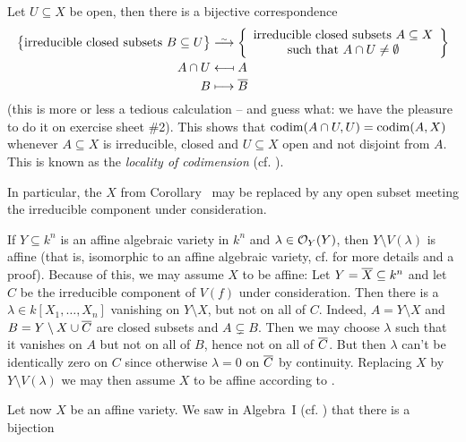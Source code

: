 \documentclass[a4paper,parskip=half,numbers=enddot, DIV=12]{scrreprt}
\begin{document}
\begin{rem}
    \begin{alphanumerate}
	   \item{} Let $U\subseteq X$ be open, then there is a bijective correspondence 
        \begin{align*}
	        \big\{\text{irreducible closed subsets }B\subseteq U\big\}&\isomorphism\left\{
	        \begin{array}{c}
		        \text{irreducible closed subsets }A\subseteq X\\
		        \text{such that }A\cap U\not=\emptyset
	        \end{array}
	        \right\}\\
            A\cap U &\longmapsfrom A\\
            B&\longmapsto \overline{B}
        \end{align*}
        (this is more or less a tedious calculation -- and guess what: we have the pleasure to do it on exercise sheet \#2). This shows that $\operatorname{codim} (A\cap U, U)  = \operatorname{codim}(A,X)$ whenever $A\subseteq X$ is irreducible, closed and $U\subseteq X$ open and not disjoint from $A$. This is known as the \emph{locality of codimension} (cf. \cite[Remark~2.1.3]{alg1}).
        \item In particular, the $X$ from Corollary~ may be replaced by any open subset meeting the irreducible component under consideration.
        \item If $Y\subseteq k^n$ is an affine algebraic variety in $k^n$ and $\lambda\in\mathcal{O}_Y(Y)$, then $Y\setminus V(\lambda)$ is affine (that is, isomorphic to an affine algebraic variety, cf. \cite[Proposition~2.2.4]{alg1} for more details and a proof). Because of this, we may assume $X$ to be affine: Let $Y=\overline X\subseteq k^n$ and let $C$ be the irreducible component of $V(f)$ under consideration. Then there is a $\lambda\in k[X_1,\ldots,X_n]$ vanishing on $Y\setminus X$, but not on all of $C$. Indeed, $A=Y\setminus X$ and $B= Y\setminus X\cup\overline C$ are closed subsets and $A\subsetneq B$. Then we may choose $\lambda$ such that it vanishes on $A$ but not on all of $B$, hence not on all of $\overline C$. But then $\lambda$ can't be identically zero on $C$ since otherwise $\lambda=0$ on $\overline C$ by continuity. Replacing $X$ by $Y\setminus V(\lambda)$ we may then assume $X$ to be affine according to .
        \item Let now $X$ be an affine variety. We saw in Algebra~I (cf. \cite[Corollary~2.2.2]{alg1}) that there is a bijection

\end{alphanumerate}
\end{rem}
\end{document}

